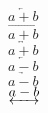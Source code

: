 $\overleftarrow{a+b}$\\
$\overrightarrow{a+b}$\\
$\overleftrightarrow{a+b}$\\
$\underleftarrow{a-b}$\\
$\underrightarrow{a-b}$\\
$\underleftrightarrow{a-b}$
